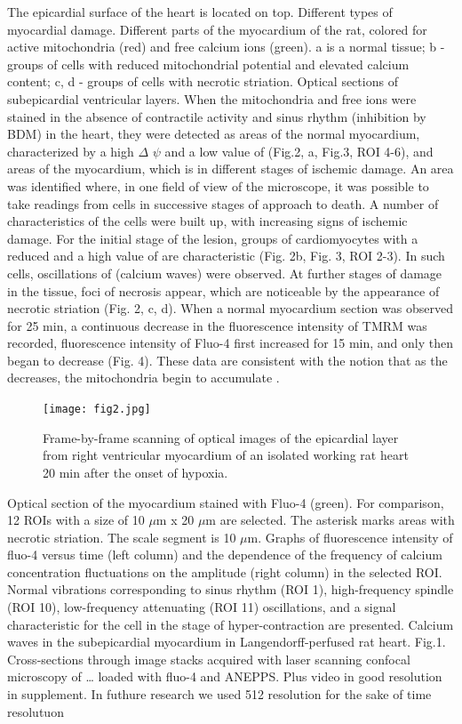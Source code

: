 \documentclass{biophys-new}
\begin{document}
The epicardial surface of the heart is located on top.
Different types of myocardial damage.
Different parts of the myocardium of the rat, colored for active mitochondria (red) and free calcium ions (green). a is a normal tissue; b - groups of cells with reduced mitochondrial potential and elevated calcium content; c, d - groups of cells with necrotic striation. Optical sections of subepicardial ventricular layers.
When the mitochondria and free  ions were stained in the absence of contractile activity and sinus rhythm (inhibition by BDM) in the heart, they were detected as areas of the normal myocardium, characterized by a high $\Delta$ $\psi$ and a low value of  (Fig.2, a, Fig.3, ROI 4-6), and areas of the myocardium, which is in different stages of ischemic damage.
An area was identified where, in one field of view of the microscope, it was possible to take readings from cells in successive stages of approach to death. A number of characteristics of the cells were built up, with increasing signs of ischemic damage.
For the initial stage of the lesion, groups of cardiomyocytes with a reduced and a high value of  are characteristic (Fig. 2b, Fig. 3, ROI 2-3). In such cells, oscillations of  (calcium waves) were observed. At further stages of damage in the tissue, foci of necrosis appear, which are noticeable by the appearance of necrotic striation (Fig. 2, c, d). When a normal myocardium section was observed for 25 min, a continuous decrease in the fluorescence intensity of TMRM was recorded, fluorescence intensity of Fluo-4 first increased for 15 min, and only then began to decrease (Fig. 4). These data are consistent with the notion that as the decreases, the mitochondria begin to accumulate .

\begin{figure}
    \texttt{[image: fig2.jpg]}
    \caption{Frame-by-frame scanning of optical images of the epicardial layer from right ventricular myocardium of an isolated working rat heart 20 min after the onset of hypoxia.}
    \label{fig:fig2}
\end{figure}


Optical section of the myocardium stained with Fluo-4 (green).
For comparison, 12 ROIs with a size of 10 $\mu$m x 20 $\mu$m are selected.
The asterisk marks areas with necrotic striation. The scale segment is 10 $\mu$m.
Graphs of fluorescence intensity of fluo-4 versus time (left column) and the dependence of the frequency of calcium concentration fluctuations on the amplitude (right column) in the selected ROI.
Normal vibrations corresponding to sinus rhythm (ROI 1), high-frequency spindle (ROI 10), low-frequency attenuating (ROI 11) oscillations, and a signal characteristic for the cell in the stage of hyper-contraction are presented.
Calcium waves in the subepicardial myocardium in Langendorff-perfused rat heart. Fig.1. Cross-sections through image stacks acquired with laser scanning confocal microscopy of … loaded with fluo-4 and ANEPPS.
Plus video in good resolution in supplement. In futhure research we used 512 resolution for the sake of time resolutuon
\end{document}
